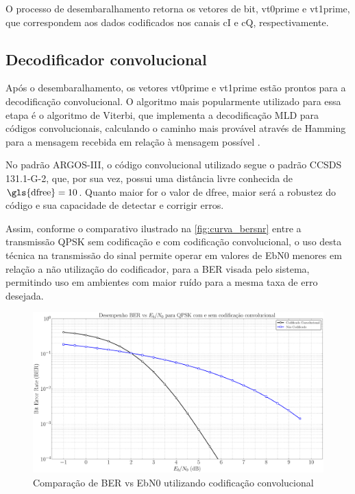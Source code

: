 O processo de desembaralhamento retorna os vetores de bit, \gls{vt0prime} e \gls{vt1prime}, que correspondem aos dados codificados nos canais \gls{cI} e \gls{cQ}, respectivamente.

\subsection{Decodificador convolucional}

Após o desembaralhamento, os vetores \gls{vt0prime} e \gls{vt1prime} estão prontos para a decodificação convolucional. O algoritmo mais popularmente utilizado para essa etapa é o algoritmo de Viterbi, que implementa a decodificação \gls{MLD} para códigos convolucionais, calculando o caminho mais provável através de \gls{Hamming} para a mensagem recebida em relação à mensagem possível \cite{cnes_services_and_message_formats_ed2_rev2_2006, rodrigues_demodulador_2018}.

No padrão \gls{ARGOS-III}, o código convolucional utilizado segue o padrão \gls{CCSDS} 131.1-G-2, que, por sua vez, possui uma distância livre conhecida de $\text{\gls{dfree}} = 10$. Quanto maior for o valor de \gls{dfree}, maior será a robustez do código e sua capacidade de detectar e corrigir erros.

\noindent Assim, conforme o comparativo ilustrado na \autoref{fig:curva_bersnr} entre a transmissão \gls{QPSK} sem codificação e com codificação convolucional, o uso desta técnica na transmissão do sinal permite operar em valores de \gls{EbN0} menores em relação a não utilização do codificador, para a \gls{BER} visada pelo sistema, permitindo uso em ambientes com maior ruído para a mesma taxa de erro desejada.

\begin{figure}[H]
	\centering
	\caption{Comparação de BER vs \gls{EbN0} utilizando codificação convolucional}\label{fig:curva_bersnr}
	\includegraphics[width=\linewidth]{assets/cap2/bersnr.pdf}
\end{figure}